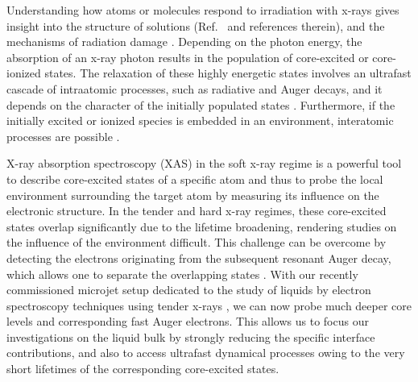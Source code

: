 Understanding how atoms or molecules respond to irradiation with x-rays gives insight into the structure of solutions (Ref.\ \citep{smith17:13909} and references therein), and the mechanisms of radiation damage \citep{ONeill02:329,Carugo05:213,Stumpf16:237}. Depending on the photon energy, the absorption of an x-ray photon results in the population of core-excited or core-ionized states. The relaxation of these highly energetic states involves an ultrafast cascade of intraatomic processes, such as radiative and Auger decays, and it depends on the character of the initially populated states \citep{stoychev08:074307,Demekhin08:043421,Demekhin09:104303,Ouchi11:053415,Miteva14:164303,travnikova16:213001,Gokhberg14:661,Trinter14:664}. Furthermore, if the initially excited or ionized species is embedded in an environment, interatomic processes are possible \citep{Pokapanich09:7264,Pokapanich11:13430,Stumpf16:237,unger17:708,ceolin17:263003}.


X-ray absorption spectroscopy (XAS) in the soft x-ray regime is a powerful tool to describe core-excited states of a specific atom and thus to probe the local environment surrounding the target atom by measuring its influence on the electronic structure. In the tender and hard x-ray regimes, these core-excited states overlap significantly due to the lifetime broadening, rendering studies on the influence of the environment difficult. This challenge can be overcome by detecting the electrons originating from the subsequent resonant Auger decay, which allows one to separate the overlapping states \citep{foehlisch05:373,goldsz16:15133}. With our recently commissioned microjet setup dedicated to the study of liquids by electron spectroscopy techniques using tender x-rays \citep{ceolin13:188,rueff15:175}, we can now probe much deeper core levels and corresponding fast Auger electrons. This allows us to focus our investigations on the liquid bulk by strongly reducing the specific interface contributions, and also to access ultrafast dynamical processes
owing to the very short lifetimes of the corresponding core-excited states.


